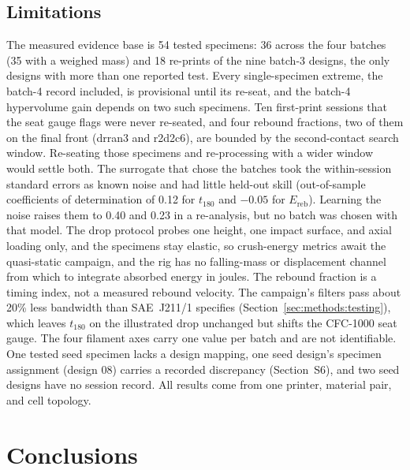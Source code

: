 \documentclass[11pt]{article}
\begin{document}
\subsection{Limitations}
The measured evidence base is 54 tested specimens: 36
across the four batches (35 with a weighed mass) and 18 re-prints of
the nine batch-3 designs, the only designs with more than one reported
test. Every single-specimen extreme, the batch-4 record included, is
provisional until its re-seat, and the batch-4 hypervolume gain depends
on two such specimens. Ten first-print sessions that the seat gauge
flags were never re-seated, and four rebound fractions, two of them on
the final front (drran3 and r2d2c6), are bounded by the second-contact
search window. Re-seating those specimens and re-processing with a
wider window would settle both. The surrogate
that chose the batches took the within-session standard errors as known
noise and had little held-out skill (out-of-sample coefficients of
determination of 0.12 for $t_{180}$ and $-0.05$ for $E_{\mathrm{reb}}$).
Learning the noise raises them to 0.40 and 0.23 in a re-analysis, but no
batch was chosen with that model. The drop protocol
probes one height, one impact surface, and axial loading only, and the
specimens stay elastic, so crush-energy metrics await the quasi-static
campaign, and the rig has no falling-mass or displacement channel from
which to integrate absorbed energy in joules. The rebound fraction is a
timing index, not a measured rebound velocity. The campaign's filters
pass about 20\% less bandwidth than SAE~J211/1 specifies
(Section~\ref{sec:methods:testing}), which leaves $t_{180}$ on the
illustrated drop unchanged but shifts the CFC-1000 seat gauge. The four
filament axes carry one value per batch and are not identifiable. One
tested seed specimen lacks a design mapping, one seed design's specimen
assignment (design 08) carries a recorded discrepancy
(Section~S6), and two seed designs have no
session record. All results come from one printer, material pair, and
cell topology.

\section{Conclusions}
\label{sec:conclusions}
\end{document}
